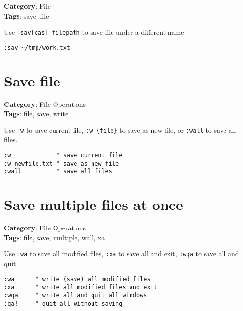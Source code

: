 {{{{{{\textbf{Category}: File\\ \textbf{Tags}: save, file
\vspace{0.5cm}

Use {\footnotesize \Verb§:sav[eas] filepath§} to save file under a different name

\begin{Exa*}{}
\begin{Verbatim}[fontsize=\footnotesize, breaklines, breakanywhere]
:sav ~/tmp/work.txt
\end{Verbatim}
\end{Exa*}

\section{Save file}

\textbf{Category}: File Operations\\ \textbf{Tags}: file, save, write
\vspace{0.5cm}

Use {\footnotesize \Verb§:w§} to save current file, {\footnotesize \Verb§:w {file}§} to save as new file, or {\footnotesize \Verb§:wall§} to save all files.

\begin{Exa*}{}
\begin{Verbatim}[fontsize=\footnotesize, breaklines, breakanywhere]
:w             " save current file
:w newfile.txt " save as new file
:wall          " save all files
\end{Verbatim}
\end{Exa*}

\section{Save multiple files at once}

\textbf{Category}: File Operations\\ \textbf{Tags}: file, save, multiple, wall, xa
\vspace{0.5cm}

Use {\footnotesize \Verb§:wa§} to save all modified files, {\footnotesize \Verb§:xa§} to save all and exit, {\footnotesize \Verb§:wqa§} to save all and quit.

\begin{Exa*}{}
\begin{Verbatim}[fontsize=\footnotesize, breaklines, breakanywhere]
:wa      " write (save) all modified files
:xa      " write all modified files and exit
:wqa     " write all and quit all windows
:qa!     " quit all without saving
\end{Verbatim}
\end{Exa*}

}}}}}}
